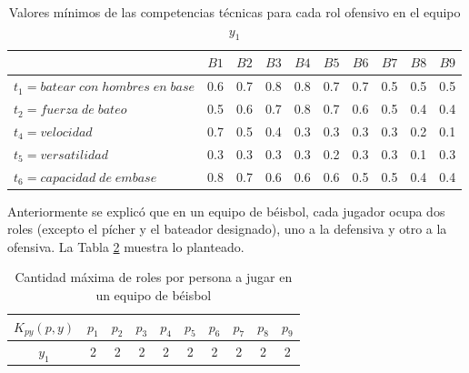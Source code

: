 \begin{table}[H]
	\centering
	\caption{Valores mínimos de las competencias técnicas para cada rol ofensivo en el equipo $y_1$}\label{mcto1-pel}
	\begin{tabular}{|l|c|c|c|c|c|c|c|c|c|}
		\hline
		\thead{$Q(t,r,y)$} & $B1$ & $B2$ & $B3$ & $B4$ & $B5$ & $B6$ & $B7$ & $B8$ & $B9$  \\ \hline
		$t_1=batear\;con\;hombres\;en\;base$ 	     & 0.6  & 0.7  & 0.8  & 0.8  & 0.7  & 0.7  & 0.5  & 0.5  & 0.5 \\ \hline
		$t_2=fuerza\;de\;bateo$ 		 & 0.5  & 0.6  & 0.7  & 0.8  & 0.7  & 0.6  & 0.5  & 0.4  & 0.4 \\ \hline
		$t_4=velocidad$ 		 & 0.7  & 0.5  & 0.4  & 0.3  & 0.3  & 0.3  & 0.3  & 0.2  & 0.1 \\ \hline
		$t_5=versatilidad$   	 & 0.3  & 0.3  & 0.3  & 0.3  & 0.2  & 0.3  & 0.3  & 0.1  & 0.3 \\ \hline
		$t_6=capacidad\;de\;embase$ & 0.8 &  0.7  &  0.6 & 0.6  & 0.6  & 0.5  & 0.5  &  0.4 & 0.4 \\ \hline
	\end{tabular} 
\end{table}




Anteriormente se explicó que en un equipo de béisbol, cada jugador ocupa dos roles (excepto el pícher y el bateador designado), uno a la defensiva y otro a la ofensiva. La Tabla \ref{cmrpp-pel} muestra lo planteado.
\begin{table}[H]
	\centering
	\caption{Cantidad máxima de roles por persona a jugar en un equipo de béisbol }\label{cmrpp-pel}
	\begin{tabular}{|c|c|c|c|c|c|c|c|c|c|}
		\hline
		$K_{py}(p,y)$ & $p_1$ & $p_2$ & $p_3$  & $p_4$ & $p_5$ & $p_6$ & $p_7$  & $p_8$ & $p_9$ \\ \hline
		$y_1$ & 2 & 2 & 2 & 2 & 2 & 2 & 2 & 2 & 2 \\ \hline
	\end{tabular}
\end{table}


